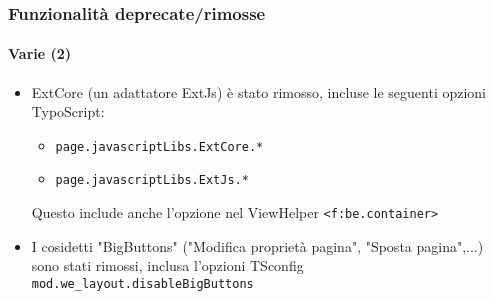 \begin{frame}[fragile]
	\frametitle{Funzionalità deprecate/rimosse}
	\framesubtitle{Varie (2)}

	\begin{itemize}

		\item ExtCore (un adattatore ExtJs) è stato rimosso, incluse le seguenti opzioni TypoScript:

			\begin{itemize}
				\item \texttt{page.javascriptLibs.ExtCore.*}
				\item \texttt{page.javascriptLibs.ExtJs.*}
			\end{itemize}

			Questo include anche l'opzione nel ViewHelper \texttt{<f:be.container>} 

		\item I cosidetti "BigButtons" ("Modifica proprietà pagina", "Sposta pagina",...) sono stati rimossi,
			inclusa l'opzioni TSconfig \texttt{mod.we\_layout.disableBigButtons}

	\end{itemize}

\end{frame}


